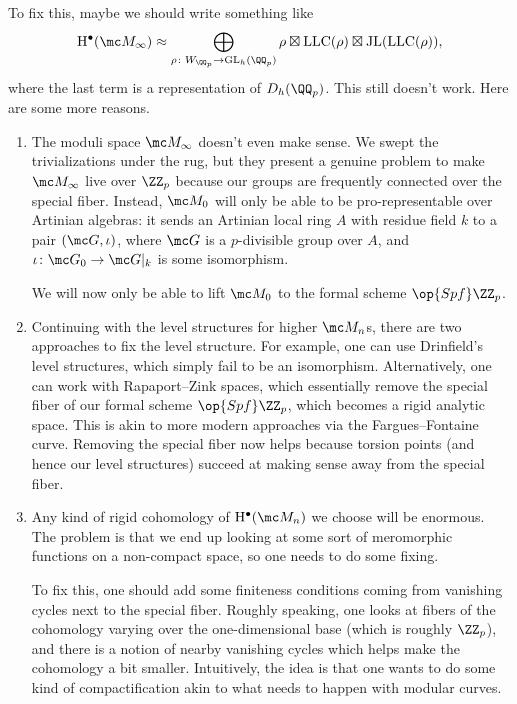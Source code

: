 \documentclass[../notes.tex]{subfiles}
\begin{document}
To fix this, maybe we should write something like
\[\mathrm H^\bullet(\mc M_\infty)\approx\bigoplus_{\rho\colon W_{\QQ_p}\to\mathrm{GL}_h(\QQ_p)}\rho\boxtimes\mathrm{LLC}(\rho)\boxtimes\mathrm{JL}(\mathrm{LLC}(\rho)),\]
where the last term is a representation of $D_h(\QQ_p)$. This still doesn't work. Here are some more reasons.
\begin{enumerate}[label=(\roman*), resume]
	\item The moduli space $\mc M_\infty$ doesn't even make sense. We swept the trivializations under the rug, but they present a genuine problem to make $\mc M_\infty$ live over $\ZZ_p$ because our groups are frequently connected over the special fiber. Instead, $\mc M_0$ will only be able to be pro-representable over Artinian algebras: it sends an Artinian local ring $A$ with residue field $k$ to a pair $(\mc G,\iota)$, where $\mc G$ is a $p$-divisible group over $A$, and $\iota\colon\mc G_0\to\mc G|_k$ is some isomorphism.
	
	We will now only be able to lift $\mc M_0$ to the formal scheme $\op{Spf}\ZZ_p$.

	\item Continuing with the level structures for higher $\mc M_n$s, there are two approaches to fix the level structure. For example, one can use Drinfield's level structures, which simply fail to be an isomorphism. Alternatively, one can work with Rapaport--Zink spaces, which essentially remove the special fiber of our formal scheme $\op{Spf}\ZZ_p$, which becomes a rigid analytic space. This is akin to more modern approaches via the Fargues--Fontaine curve. Removing the special fiber now helps because torsion points (and hence our level structures) succeed at making sense away from the special fiber.

	\item Any kind of rigid cohomology of $\mathrm H^\bullet(\mc M_n)$ we choose will be enormous. The problem is that we end up looking at some sort of meromorphic functions on a non-compact space, so one needs to do some fixing.

	To fix this, one should add some finiteness conditions coming from vanishing cycles next to the special fiber. Roughly speaking, one looks at fibers of the cohomology varying over the one-dimensional base (which is roughly $\ZZ_p$), and there is a notion of nearby vanishing cycles which helps make the cohomology a bit smaller. Intuitively, the idea is that one wants to do some kind of compactification akin to what needs to happen with modular curves.


\end{enumerate}
\end{document}
